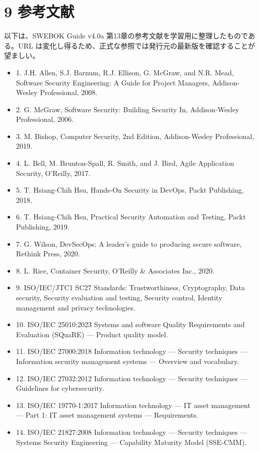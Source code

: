 \documentclass[uplatex,dvipdfmx,a4paper,11pt]{jsarticle}
\begin{document}
\section{9 参考文献}
以下は、SWEBOK Guide v4.0a 第13章の参考文献を学習用に整理したものである。URL は変化し得るため、正式な参照では発行元の最新版を確認することが望ましい。

\begin{itemize}[leftmargin=2em]
\item 1. J.H. Allen, S.J. Barnum, R.J. Ellison, G. McGraw, and N.R. Mead, Software Security Engineering: A Guide for Project Managers, Addison-Wesley Professional, 2008.
\item 2. G. McGraw, Software Security: Building Security In, Addison-Wesley Professional, 2006.
\item 3. M. Bishop, Computer Security, 2nd Edition, Addison-Wesley Professional, 2019.
\item 4. L. Bell, M. Brunton-Spall, R. Smith, and J. Bird, Agile Application Security, O’Reilly, 2017.
\item 5. T. Hsiang-Chih Hsu, Hands-On Security in DevOps, Packt Publishing, 2018.
\item 6. T. Hsiang-Chih Hsu, Practical Security Automation and Testing, Packt Publishing, 2019.
\item 7. G. Wilson, DevSecOps: A leader’s guide to producing secure software, Rethink Press, 2020.
\item 8. L. Rice, Container Security, O’Reilly \& Associates Inc., 2020.
\item 9. ISO/IEC/JTC1 SC27 Standards: Trustworthiness, Cryptography, Data security, Security evaluation and testing, Security control, Identity management and privacy technologies.
\item 10. ISO/IEC 25010:2023 Systems and software Quality Requirements and Evaluation (SQuaRE) — Product quality model.
\item 11. ISO/IEC 27000:2018 Information technology — Security techniques — Information security management systems — Overview and vocabulary.
\item 12. ISO/IEC 27032:2012 Information technology — Security techniques — Guidelines for cybersecurity.
\item 13. ISO/IEC 19770-1:2017 Information technology — IT asset management — Part 1: IT asset management systems — Requirements.
\item 14. ISO/IEC 21827:2008 Information technology — Security techniques — Systems Security Engineering — Capability Maturity Model (SSE-CMM).

\end{itemize}
\end{document}
